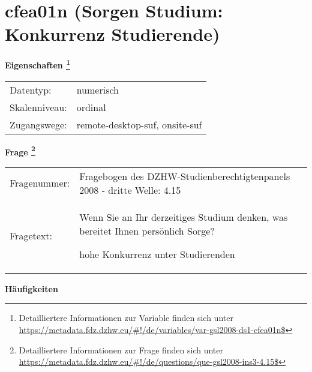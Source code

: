 
    \setcounter{footnote}{0}

    \vspace*{-1.8cm}
	\section{cfea01n (Sorgen Studium: Konkurrenz Studierende)}
	\label{section:cfea01n}



    \vspace*{0.5cm}
    \noindent\textbf{Eigenschaften
	\footnote{Detailliertere Informationen zur Variable finden sich unter
		\url{https://metadata.fdz.dzhw.eu/\#!/de/variables/var-gsl2008-ds1-cfea01n$}}}\\
	\begin{tabularx}{\hsize}{@{}lX}
	Datentyp: & numerisch \\
	Skalenniveau: & ordinal \\
	Zugangswege: &
	  remote-desktop-suf, 
	  onsite-suf
 \\
    \end{tabularx}



				\vspace*{0.5cm}
                \noindent\textbf{Frage
	                \footnote{Detailliertere Informationen zur Frage finden sich unter
		              \url{https://metadata.fdz.dzhw.eu/\#!/de/questions/que-gsl2008-ins3-4.15$}}}\\
				\begin{tabularx}{\hsize}{@{}lX}
					Fragenummer: &
					  Fragebogen des DZHW-Studienberechtigtenpanels 2008 - dritte Welle:
					  4.15
 \\
					Fragetext: & Wenn Sie an Ihr derzeitiges Studium denken, was bereitet Ihnen persönlich Sorge?\par  hohe Konkurrenz unter Studierenden \\
				\end{tabularx}





        		\vspace*{0.5cm}
                \noindent\textbf{Häufigkeiten}

